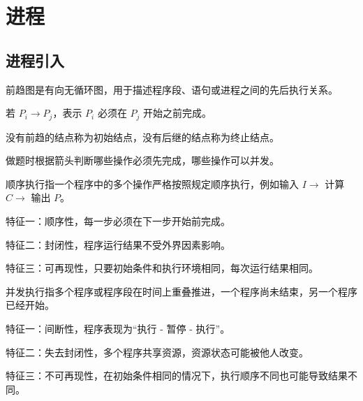 \chapter{进程}

\section{进程引入}
\begin{points}
  \item 前趋图是有向无循环图，用于描述程序段、语句或进程之间的先后执行关系。
  \item 若 $P_i \rightarrow P_j$，表示 $P_i$ 必须在 $P_j$ 开始之前完成。
  \item 没有前趋的结点称为初始结点，没有后继的结点称为终止结点。
  \item 做题时根据箭头判断哪些操作必须先完成，哪些操作可以并发。
\end{points}


\begin{points}
  \item 顺序执行指一个程序中的多个操作严格按照规定顺序执行，例如输入 $I \rightarrow$ 计算 $C \rightarrow$ 输出 $P$。
  \item 特征一：顺序性，每一步必须在下一步开始前完成。
  \item 特征二：封闭性，程序运行结果不受外界因素影响。
  \item 特征三：可再现性，只要初始条件和执行环境相同，每次运行结果相同。
\end{points}


\begin{points}
  \item 并发执行指多个程序或程序段在时间上重叠推进，一个程序尚未结束，另一个程序已经开始。
  \item 特征一：间断性，程序表现为“执行 - 暂停 - 执行”。
  \item 特征二：失去封闭性，多个程序共享资源，资源状态可能被他人改变。
  \item 特征三：不可再现性，在初始条件相同的情况下，执行顺序不同也可能导致结果不同。
\end{points}

